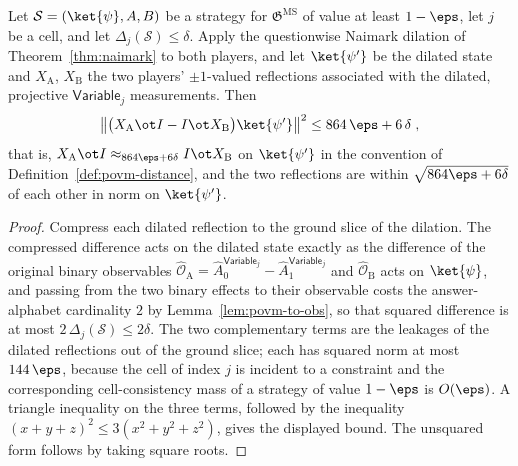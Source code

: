 \begin{lemma}\label{lem:ms-varobs-cross-player}
	\leanok
	Let $\mathcal S = (\ket{\psi}, A, B)$ be a strategy for $\mathfrak{G}^{\mathrm{MS}}$ of value at least $1-\eps$, let $j$ be a cell, and let $\Delta_j(\mathcal S) \le \delta$. Apply the questionwise Naimark dilation of Theorem~\ref{thm:naimark} to both players, and let $\ket{\psi'}$ be the dilated state and $X_{\mathrm A}$, $X_{\mathrm B}$ the two players' $\pm 1$-valued reflections associated with the dilated, projective $\mathsf{Variable}_j$ measurements. Then
	\[
		\bigl\| \bigl( X_{\mathrm A} \ot I - I \ot X_{\mathrm B} \bigr) \ket{\psi'} \bigr\|^2 \le 864\,\eps + 6\,\delta \;,
	\]
	that is, $X_{\mathrm A} \ot I \approx_{864\eps + 6\delta} I \ot X_{\mathrm B}$ on $\ket{\psi'}$ in the convention of Definition~\ref{def:povm-distance}, and the two reflections are within $\sqrt{864\eps + 6\delta}$ of each other in norm on $\ket{\psi'}$.
\end{lemma}
\begin{proof}
	\leanok
	Compress each dilated reflection to the ground slice of the dilation. The compressed difference acts on the dilated state exactly as the difference of the original binary observables $\hat{\mathcal O}_{\mathrm A} = \hat A^{\mathsf{Variable}_j}_0 - \hat A^{\mathsf{Variable}_j}_1$ and $\hat{\mathcal O}_{\mathrm B}$ acts on $\ket{\psi}$, and passing from the two binary effects to their observable costs the answer-alphabet cardinality $2$ by Lemma~\ref{lem:povm-to-obs}, so that squared difference is at most $2\,\Delta_j(\mathcal S) \le 2\delta$. The two complementary terms are the leakages of the dilated reflections out of the ground slice; each has squared norm at most $144\,\eps$, because the cell of index $j$ is incident to a constraint and the corresponding cell-consistency mass of a strategy of value $1-\eps$ is $O(\eps)$. A triangle inequality on the three terms, followed by the inequality $(x+y+z)^2 \le 3(x^2+y^2+z^2)$, gives the displayed bound. The unsquared form follows by taking square roots.
\end{proof}

